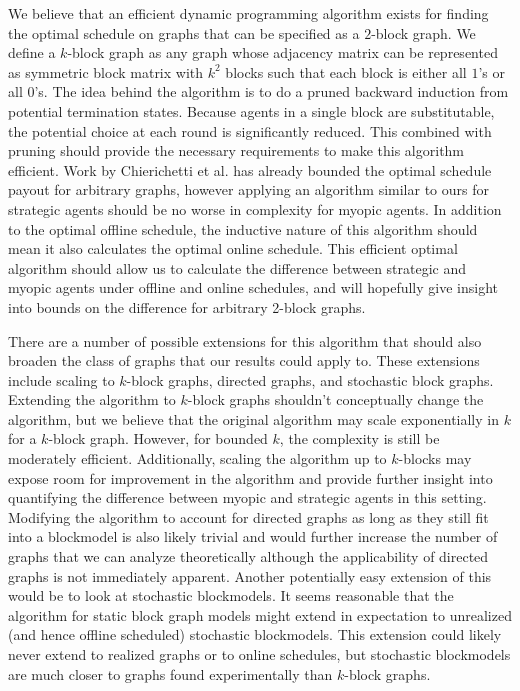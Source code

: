 \documentclass{article}
\begin{document}
We believe that an efficient dynamic programming algorithm exists for
finding the optimal schedule on graphs that can be specified as a
$2$-block graph. We define a $k$-block graph as any graph whose
adjacency matrix can be represented as symmetric block matrix with
$k^2$ blocks such that each block is either all $1$'s or all
$0$'s. The idea behind the algorithm is to do a pruned backward
induction from potential termination states. Because agents in a
single block are substitutable, the potential choice at each round is
significantly reduced. This combined with pruning should provide the
necessary requirements to make this algorithm efficient. Work by
Chierichetti et al.\cite{Chierichetti12} has already bounded the
optimal schedule payout for arbitrary graphs, however applying an
algorithm similar to ours for strategic agents should be no worse in
complexity for myopic agents. In addition to the optimal offline
schedule, the inductive nature of this algorithm should mean it also
calculates the optimal online schedule. This efficient optimal
algorithm should allow us to calculate the difference between
strategic and myopic agents under offline and online schedules, and
will hopefully give insight into bounds on the difference for
arbitrary 2-block graphs.

There are a number of possible extensions for this algorithm that
should also broaden the class of graphs that our results could apply
to. These extensions include scaling to $k$-block graphs, directed
graphs, and stochastic block graphs. Extending the algorithm to
$k$-block graphs shouldn’t conceptually change the algorithm, but we
believe that the original algorithm may scale exponentially in $k$ for
a $k$-block graph. However, for bounded $k$, the complexity is still
be moderately efficient. Additionally, scaling the algorithm up to
$k$-blocks may expose room for improvement in the algorithm and
provide further insight into quantifying the difference between myopic
and strategic agents in this setting. Modifying the algorithm to
account for directed graphs as long as they still fit into a
blockmodel is also likely trivial and would further increase the
number of graphs that we can analyze theoretically although the
applicability of directed graphs is not immediately apparent. Another
potentially easy extension of this would be to look at stochastic
blockmodels\cite{Wang87, Snijders97}. It seems reasonable that the
algorithm for static block graph models might extend in expectation to
unrealized (and hence offline scheduled) stochastic blockmodels. This
extension could likely never extend to realized graphs or to online
schedules, but stochastic blockmodels are much closer to graphs found
experimentally than $k$-block graphs.
\end{document}
